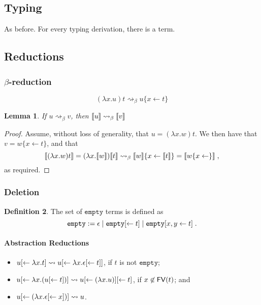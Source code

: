 \documentclass[11pt,a4paper]{article}
\theoremstyle{definition}
\newtheorem{definition}{Definition}
\theoremstyle{plain}
\newtheorem{lemma}[definition]{Lemma}
\theoremstyle{remark}
\begin{document}
\subsection{Typing}

As before. For every typing derivation, there is a term.

\subsection{Reductions}

\subsubsection{$\beta$-reduction}

\[
(\lambda x.u)t \rightsquigarrow_\beta u\{x\leftarrow t\}
\]


\begin{lemma}
	If $u\rightsquigarrow_\beta v$, then ${\llbracket{u}\rrbracket}\rightsquigarrow_\beta{\llbracket{v}\rrbracket}$
\end{lemma}

\begin{proof}
	Assume, without loss of generality, that $u=(\lambda x.w)t$. We then have that $v=w\{x\leftarrow t\}$, and that
	\[
	{\llbracket{(\lambda x.w)t}\rrbracket}=(\lambda x.{\llbracket{w}\rrbracket}){\llbracket{t}\rrbracket}\rightsquigarrow_\beta{\llbracket{w}\rrbracket}\{x\leftarrow{\llbracket{t}\rrbracket}\}={\llbracket{w\{x\leftarrow\}}\rrbracket}\;,
	\]
	as required.
\end{proof}

\subsubsection{Deletion}

\newcommand{\tempty}{{\mathtt{empty}}}

\begin{definition}
	The set of $\tempty$ terms is defined as
	\[\tempty:=\epsilon\;|\;\tempty\terdel{t}\;|\;\tempty\terdup{x}{y}{t}\;.\]
\end{definition}

\paragraph{Abstraction Reductions}

\begin{itemize}
	\item $u{[\leftarrow{\lambda x.t}]}\rightsquigarrow u{[\leftarrow{\lambda x.\epsilon{[\leftarrow{t}]}}]}$, if $t$ is not $\tempty$;
	\item $u{[\leftarrow{\lambda x.(u{[\leftarrow{t}]})}]}\rightsquigarrow u{[\leftarrow{(\lambda x.u)}]}{[\leftarrow{t}]}$, if $x\not\in{\mathop{\mathsf{FV}}}(t)$; and
	\item $u{[\leftarrow{(\lambda x.\epsilon{[\leftarrow{x}]})}]}\rightsquigarrow u$.
\end{itemize}
\end{document}
